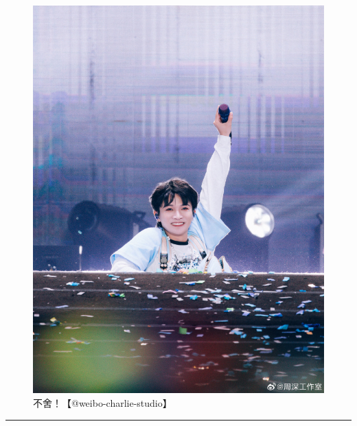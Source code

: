 \documentclass[]{ctexbook}
\begin{document}
\begin{figure}

{\centering \includegraphics[width=400pt]{img/suzhou20241110/003} 

}

\caption{不舍！【@weibo-charlie-studio】}\label{fig:unnamed-chunk-139}
\end{figure}

\begin{center}\rule{0.5\linewidth}{0.5pt}\end{center}
\end{document}
